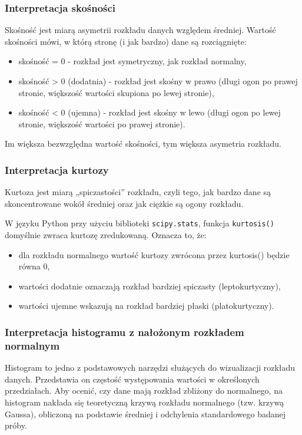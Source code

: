 \documentclass[12pt,a4paper]{article}
\begin{document}
\subsubsection*{Interpretacja skośności}
Skośność jest miarą asymetrii rozkładu danych względem średniej. Wartość skośności mówi, w którą stronę (i jak bardzo) dane są rozciągnięte:
\begin{itemize}
    \item skośność = 0 - rozkład jest symetryczny, jak rozkład normalny,
    \item skośność > 0 (dodatnia) - rozkład jest skośny w prawo (długi ogon po prawej stronie, większość wartości skupiona po lewej stronie),
    \item skośność < 0 (ujemna) - rozkład jest skośny w lewo (długi ogon po lewej stronie, większość wartości po prawej stronie).
\end{itemize}
Im większa bezwzględna wartość skośności, tym większa asymetria rozkładu.

\subsubsection*{Interpretacja kurtozy}
Kurtoza jest miarą „spiczastości” rozkładu, czyli tego, jak bardzo dane są skoncentrowane wokół średniej oraz jak ciężkie są ogony rozkładu.

W języku Python przy użyciu biblioteki \texttt{scipy.stats}, funkcja \texttt{kurtosis()} domyślnie zwraca kurtozę zredukowaną. Oznacza to, że:
\begin{itemize}
    \item dla rozkładu normalnego wartość kurtozy zwrócona przez kurtosis() będzie równa 0,
    \item wartości dodatnie oznaczają rozkład bardziej spiczasty (leptokurtyczny),
    \item wartości ujemne wskazują na rozkład bardziej płaski (platokurtyczny).
\end{itemize}

\subsubsection*{Interpretacja histogramu z nałożonym rozkładem normalnym}
Histogram to jedno z podstawowych narzędzi służących do wizualizacji rozkładu danych. Przedstawia on częstość występowania wartości w określonych przedziałach. Aby ocenić, czy dane mają rozkład zbliżony do normalnego, na histogram nakłada się teoretyczną krzywą rozkładu normalnego (tzw. krzywą Gaussa), obliczoną na podstawie średniej i odchylenia standardowego badanej próby.
\end{document}

